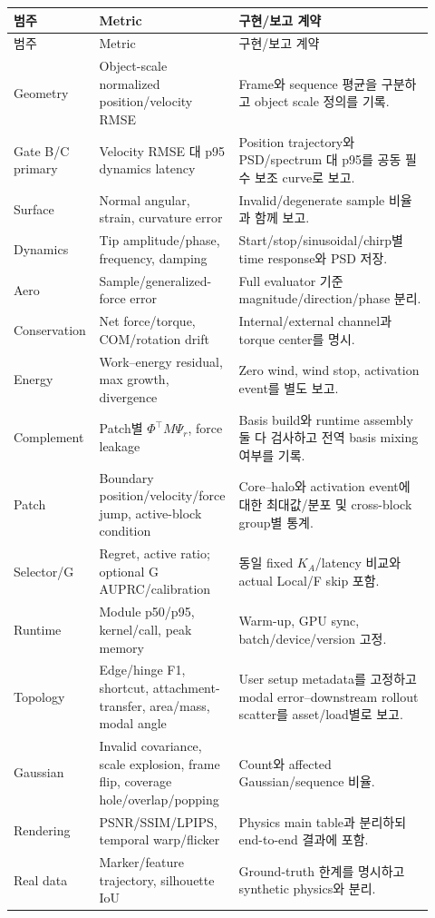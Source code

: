 \documentclass[10pt,a4paper]{article}
\begin{document}
\small
\begin{longtable}{L{0.17\linewidth}L{0.29\linewidth}L{0.46\linewidth}}
\toprule
범주 & Metric & 구현/보고 계약 \\
\midrule
\endfirsthead
\toprule
범주 & Metric & 구현/보고 계약 \\
\midrule
\endhead
Geometry & Object-scale normalized position/velocity RMSE & Frame와 sequence 평균을 구분하고 object scale 정의를 기록. \\
Gate B/C primary & Velocity RMSE 대 p95 dynamics latency & Position trajectory와 PSD/spectrum 대 p95를 공동 필수 보조 curve로 보고. \\
Surface & Normal angular, strain, curvature error & Invalid/degenerate sample 비율과 함께 보고. \\
Dynamics & Tip amplitude/phase, frequency, damping & Start/stop/sinusoidal/chirp별 time response와 PSD 저장. \\
Aero & Sample/generalized-force error & Full evaluator 기준 magnitude/direction/phase 분리. \\
Conservation & Net force/torque, COM/rotation drift & Internal/external channel과 torque center를 명시. \\
Energy & Work--energy residual, max growth, divergence & Zero wind, wind stop, activation event를 별도 보고. \\
Complement & Patch별 \(\Phi^\top M\Psi_r\), force leakage & Basis build와 runtime assembly 둘 다 검사하고 전역 basis mixing 여부를 기록. \\
Patch & Boundary position/velocity/force jump, active-block condition & Core--halo와 activation event에 대한 최대값/분포 및 cross-block group별 통계. \\
Selector/G & Regret, active ratio; optional G AUPRC/calibration & 동일 fixed \(K_A\)/latency 비교와 actual Local/F skip 포함. \\
Runtime & Module p50/p95, kernel/call, peak memory & Warm-up, GPU sync, batch/device/version 고정. \\
Topology & Edge/hinge F1, shortcut, attachment-transfer, area/mass, modal angle & User setup metadata를 고정하고 modal error--downstream rollout scatter를 asset/load별로 보고. \\
Gaussian & Invalid covariance, scale explosion, frame flip, coverage hole/overlap/popping & Count와 affected Gaussian/sequence 비율. \\
Rendering & PSNR/SSIM/LPIPS, temporal warp/flicker & Physics main table과 분리하되 end-to-end 결과에 포함. \\
Real data & Marker/feature trajectory, silhouette IoU & Ground-truth 한계를 명시하고 synthetic physics와 분리. \\
\bottomrule
\end{longtable}
\normalsize
\end{document}
